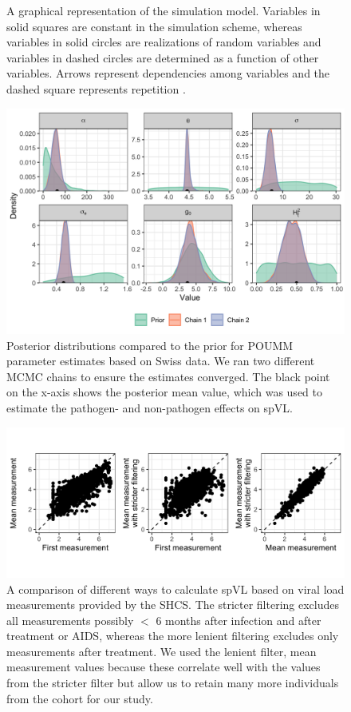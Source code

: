 \documentclass[]{article}
\begin{document}
\begin{doublespace}
\begin{figure}[H]
\begin{tikzpicture}
	\end{tikzpicture}
	\caption{A graphical representation of the simulation model. Variables in solid squares are constant in the simulation scheme, whereas variables in solid circles are realizations of random variables and variables in dashed circles are determined as a function of other variables. Arrows represent dependencies among variables and the dashed square represents repetition \citep{Hohna2014}.}
	\label{fig:sim-design}
\end{figure}

\begin{figure}[H]
	\centering
		\includegraphics[width=0.7\linewidth]{figures/poumm_parameter_estimates.png}
		\caption{Posterior distributions compared to the prior for POUMM parameter estimates based on Swiss data. We ran two different MCMC chains to ensure the estimates converged. The black point on the x-axis shows the posterior mean value, which was used to estimate the pathogen- and non-pathogen effects on spVL.}
\label{fig:poumm-parameters}
\end{figure}

\begin{figure}[H]
\begin{center}
\includegraphics[width = 0.462\linewidth]{figures/spvl_calculation_comparison.png}
	\caption{A comparison of different ways to calculate spVL based on viral load measurements provided by the SHCS. The stricter filtering excludes all measurements possibly $<$ 6 months after infection and after treatment or AIDS, whereas the more lenient filtering excludes only measurements after treatment. We used the lenient filter, mean measurement values because these correlate well with the values from the stricter filter but allow us to retain many more individuals from the cohort for our study.}
	\label{fig:spvl-calc-comparison}
	\end{center}
\end{figure}


\end{doublespace}
\end{document}
